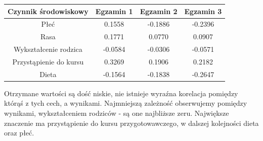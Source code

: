 \documentclass[12pt]{article}
\begin{document}
\begin{table}[H]
\centering
\begin{tabular}{|c|c|c|c|} 
\hline
 Czynnik środowiskowy & Egzamin 1 & Egzamin 2 & Egzamin 3  \\ 
\hline
Płeć & 0.1558  &  -0.1886 &  -0.2396  \\ 
\hline
Rasa &  0.1771  &  0.0770   & 0.0907 \\ 
\hline
Wykształcenie rodzica &  -0.0584  & -0.0306 &  -0.0571  \\ 
\hline
Przystąpienie do kursu & 0.3269  &  0.1906  &  0.2182  \\ 
\hline
Dieta &  -0.1564  & -0.1838   & -0.2647  \\ 
\hline
\end{tabular}
\end{table}

Otrzymane wartości są dość niskie, nie istnieje wyraźna korelacja pomiędzy którąś z tych cech, a wynikami. Najmniejszą zależność obserwujemy pomiędzy wynikami, wykształceniem rodziców - są one najbliższe zeru. Największe znaczenie ma przystąpienie do kursu przygotowawczego, w dalszej kolejności dieta oraz płeć.
\end{document}
